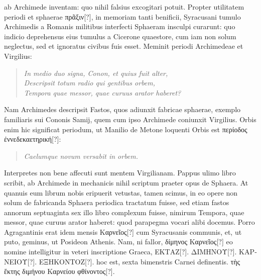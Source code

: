  ab Archimede inventam: quo nihil falsius
excogitari potuit.
Propter utilitatem periodi et sphaerae \textgreek{πρᾶξιν[?]}, in memoriam
tanti benificii, Syracusani tumulo Archimedis a Romanis
militibus interfecti Sphaeram insculpi curarunt: quo indicio deprehensus
eius tumulus a Cicerone quaestore, cum iam non solum neglectus,
sed et ignoratus civibus fuis esset.
Meminit periodi Archimedeae
et Virgilius:
\begin{verse}
  \textit{In medio duo signa, Conon, et quius fuit alter,}\\
  \textit{Descripsit totum radio qui gentibus orbem,}\\
  \textit{Tempora quae messor, quae curuus arator haberet?}
\end{verse}
Nam Archimedes descripsit Fastos, quos adiunxit fabricae sphaerae,
exemplo familiaris sui Cononis Samij, quem cum ipso Archimede
coniunxit Virgilius.
Orbis enim hic significat periodum, ut Manilio
de Metone loquenti Orbis est \textgreek{περίοδος ἐννεδεκαετηρική[?]}:
\begin{verse}
\emd{} \textit{Caelumque novum versabit in orbem.}
\end{verse}
Interpretes non bene affecuti sunt mentem Virgilianam.
Pappus ulimo
libro scribit, ab Archimede in mechanicis nihil scriptum praeter
opus de Sphaera.
At quanuis eum librum nobis eripuerit vetustas, tamen
scimus, in eo opere non solum de fabricanda Sphaera periodica
tractatum fuisse, sed etiam fastos annorum septuaginta sex illo libro
complexum fuisse, nimirum Tempora, quae messor, quae curuus arator
haberet: quod parapegma vocari alibi docemus.
Porro Agragantinis
erat idem mensis \textgreek{Καρνεῖος[?]} cum Syracusanis communis, et, ut
puto, geminus, ut Posideon Athenis.
Nam, ni fallor, \textgreek{δίμηνος Καρνεῖος[?]}
eo nomine intelligitur in veteri inscriptione Graeca, \textgreek{ΕΚΤΑΖ[?]}.
\textgreek{ΔΙΜΗΝΟΥ[?]}. \textgreek{ΚΑΡΝΕΙΟΥ[?]}.
 \textgreek{ΕΞΗΚΟΝΤΟΖ[?]}. hoc est, sexta
bimenstris Carnei definentis.
\textgreek{τὴς ἕκτης διμήνου Καρνείου φθίνοντος[?]}.
